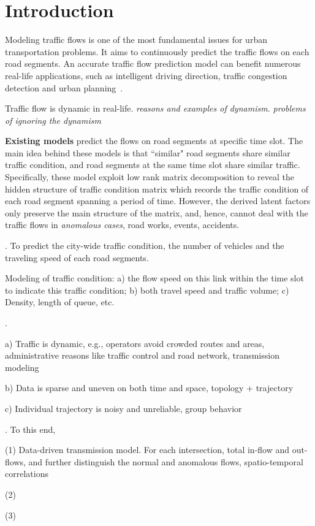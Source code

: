 \section{Introduction}
\label{sec-intro}

Modeling traffic flows is one of the most fundamental issues for urban transportation problems. It aims to continuously predict the traffic flows on each road segments. An accurate traffic flow prediction model can benefit numerous real-life applications, such as intelligent driving direction, traffic congestion detection and urban planning~\cite{Zheng2014TIST}.

Traffic flow is dynamic in real-life. {\em reasons and examples of dynamism.} {\em problems of ignoring the dynamism}

{\bf Existing models} predict the flows on road segments at specific time slot. The main idea behind these models is that ``similar" road segments share similar traffic condition, and road segments at the same time slot share similar traffic. Specifically, these model exploit low rank matrix decomposition to reveal the hidden structure of traffic condition matrix which records the traffic condition of each road segment spanning a period of time. However, the derived latent factors only preserve the main structure of the matrix, and, hence, cannot deal with the traffic flows in {\em anomalous cases}, \eg road works, events, accidents.

. To predict the city-wide traffic condition, \ie the number of vehicles and the traveling speed of each road segments.

Modeling of traffic condition:
a)	the flow speed on this link within the time slot to indicate this traffic condition;
b)	both travel speed and traffic volume;
c)	Density, length of queue, etc.

.
\bi
\item a)	Traffic is dynamic, e.g., operators avoid crowded routes and areas, administrative reasons like traffic control and road network, transmission modeling
\item b)	Data is sparse and uneven on both time and space,  topology + trajectory
\item c)	Individual trajectory is noisy and unreliable,  group behavior
\ei

. To this end,

\ni (1) Data-driven transmission model. For each intersection, total in-flow and out-flows, and further distinguish the normal and anomalous flows, spatio-temporal correlations

\ni (2)

\ni (3)

